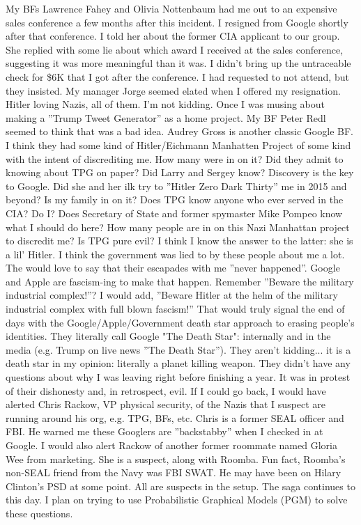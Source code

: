 \documentclass{article}
\begin{document}
\begin{multicols}{2}
My BFs Lawrence Fahey and Olivia Nottenbaum had me out to an expensive sales conference a few months after this incident. I resigned from Google shortly after that conference. I told her about the former CIA applicant to our group. She replied with some lie about which award I received at the sales conference, suggesting it was more meaningful than it was. I didn't bring up the untraceable check for \$6K that I got after the conference. I had requested to not attend, but they insisted. My manager Jorge seemed elated when I offered my resignation. Hitler loving Nazis, all of them. I'm not kidding. Once I was musing about making a ''Trump Tweet Generator'' as a home project. My BF Peter Redl seemed to think that was a bad idea. Audrey Gross is another classic Google BF. I think they had some kind of Hitler/Eichmann Manhatten Project of some kind with the intent of discrediting me. How many were in on it? Did they admit to knowing about TPG on paper? Did Larry and Sergey know? Discovery is the key to Google. Did she and her ilk try to ''Hitler Zero Dark Thirty'' me in 2015 and beyond? Is my family in on it? Does TPG know anyone who ever served in the CIA? Do I? Does Secretary of State and former spymaster Mike Pompeo know what I should do here? How many people are in on this Nazi Manhattan project to discredit me? Is TPG pure evil? I think I know the answer to the latter: she is a lil' Hitler. I think the government was lied to by these people about me a lot. The would love to say that their escapades with me ''never happened''. Google and Apple are fascism-ing to make that happen. Remember ''Beware the military industrial complex!''? I would add, ''Beware Hitler at the helm of the military industrial complex with full blown fascism!'' That would truly signal the end of days with the Google/Apple/Government death star approach to erasing people's identities. They literally call Google "The Death Star": internally and in the media (e.g. Trump on live news ''The Death Star''). They aren't kidding... it is a death star in my opinion: literally a planet killing weapon. They didn't have any questions about why I was leaving right before finishing a year. It was in protest of their dishonesty and, in retrospect, evil. If I could go back, I would have alerted Chris Rackow, VP physical security, of the Nazis that I suspect are running around his org, e.g. TPG, BFs, etc. Chris is a former SEAL officer and FBI. He warned me these Googlers are ''backstabby'' when I checked in at Google. I would also alert Rackow of another former roommate named Gloria Wee from marketing. She is a suspect, along with Roomba. Fun fact, Roomba's non-SEAL friend from the Navy was FBI SWAT. He may have been on Hilary Clinton's PSD at some point. All are suspects in the setup. The saga continues to this day. I plan on trying to use Probabilistic Graphical Models (PGM) to solve these questions. 


\end{multicols}
\end{document}

